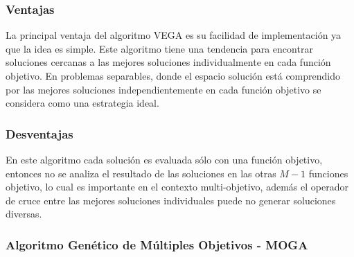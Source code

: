 \subsubsection*{Ventajas}
La principal ventaja del algoritmo VEGA es su facilidad de implementación ya que la idea es simple.
%
Este algoritmo tiene una tendencia para encontrar soluciones cercanas a las mejores soluciones individualmente en cada función objetivo. 
%
En problemas separables, donde el espacio solución está comprendido por las mejores soluciones independientemente en cada función objetivo se considera como una estrategia ideal.

\subsubsection*{Desventajas}
En este algoritmo cada solución es evaluada sólo con una función objetivo, entonces no se analiza el resultado de las soluciones en las otras $M-1$ funciones objetivo, lo cual es importante en el contexto multi-objetivo, además el operador de cruce entre las mejores soluciones individuales puede no generar soluciones diversas.

\subsubsection{Algoritmo Genético de Múltiples Objetivos - MOGA}

